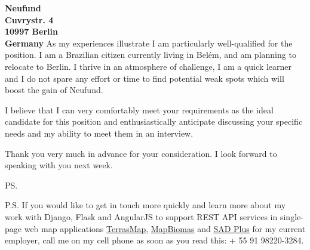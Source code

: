 \documentclass[a4paper]{joaosoares-letter}
\begin{document}
\begin{letter}{\bfseries Neufund\\Cuvrystr. 4\\10997 Berlin\\Germany}
As my experiences illustrate I am particularly well-qualified for the position. I am a Brazilian citizen currently living in Belém, and am planning to relocate to Berlin. I thrive in an atmosphere of challenge, I am a quick learner and I do not spare any effort or time to find potential weak spots which will boost the gain of Neufund.


I believe that I can very comfortably meet your requirements as the ideal candidate for this position and enthusiastically anticipate discussing your specific needs and my ability to meet them in an interview.

\closing{Thank you very much in advance for your consideration. I look forward to speaking with you next week.}
\vspace{10pt}
\ps

P.S. If you would like to get in touch more quickly and learn more about my work with Django, Flask and AngularJS to support REST API services in single-page web map applications \href{https://goo.gl/6gUzPA}{TerrasMap}, \href{https://goo.gl/eYX5SW}{MapBiomas} and \href{https://goo.gl/2J41hR}{SAD Plus} for my current employer, call me on my cell phone as soon as you read this: + 55 91 98220-3284.
\vspace{\fill}

\end{letter}
\end{document}
